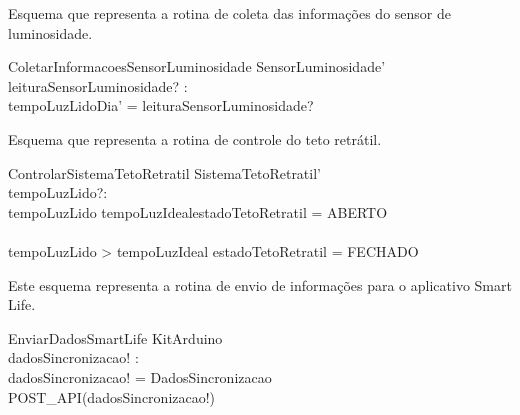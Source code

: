             Esquema que representa a rotina de coleta das informações do sensor de luminosidade.
            \begin{schema}{ColetarInformacoesSensorLuminosidade}
                \Delta SensorLuminosidade' \\
                leituraSensorLuminosidade? : \nat \\
            \where
                tempoLuzLidoDia' = leituraSensorLuminosidade? \\
            \end{schema}            

            Esquema que representa a rotina de controle do teto retrátil.
            \begin{schema}{ControlarSistemaTetoRetratil}
                \Delta SistemaTetoRetratil' \\
                tempoLuzLido?: \nat \\             
            \where
                tempoLuzLido \leq tempoLuzIdeal\implies estadoTetoRetratil = ABERTO \\
                \lor \\
                tempoLuzLido > tempoLuzIdeal \implies estadoTetoRetratil = FECHADO \\
            \end{schema}

            \newpage
            Este esquema representa a rotina de envio de informações para o aplicativo Smart Life.
            \begin{schema}{EnviarDadosSmartLife}
                \Xi KitArduino \\
                dadosSincronizacao! : \seq \\
            \where
                dadosSincronizacao! = DadosSincronizacao\\
                POST\_API(dadosSincronizacao!)
            \end{schema}